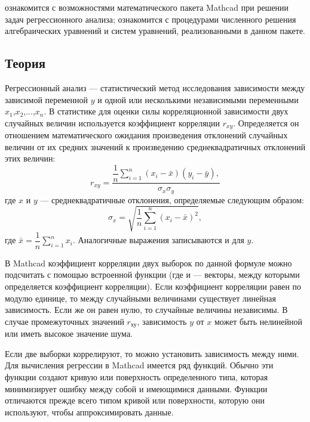 
\goal ознакомится с возможностями математического пакета Mathcad при решении задач регрессионного анализа; ознакомится с процедурами численного решения алгебраических уравнений и систем уравнений, реализованными в данном пакете. 

\subsection*{Теория}
Регрессионный анализ --- статистический метод исследования зависимости между зависимой переменной $y$ и одной или несколькими независимыми переменными $x_1$,$x_2$,...,$x_n$.
В статистике для оценки силы корреляционной зависимости двух случайных величин используется коэффициент корреляции $r_{xy}$. Определяется он отношением математического ожидания произведения отклонений случайных величин от их средних значений к произведению среднеквадратичных отклонений этих величин:
\begin{equation}
	r_{xy}=\dfrac{\dfrac{1}{n} \sum\limits_{i=1}^{n} (x_i-\bar{x}) (y_i-\bar{y}), }{\sigma_x \sigma_y}
\end{equation}
где $x$ и $y$ --- среднеквадратичные отклонения, определяемые следующим образом:
\begin{equation}
	\sigma_x=\sqrt{\dfrac{1}{n} \sum\limits_{i=1}^{n}(x_i-\bar{x})^2},
\end{equation}
где $\bar{x}=\dfrac{1}{n} \sum\limits_{i=1}^{n} x_i$.
Аналогичные выражения записываются и для $y$.

В Mathcad коэффициент корреляции двух выборок по данной формуле можно подсчитать с помощью встроенной функции  (где  и  --- векторы, между которыми определяется коэффициент корреляции). Если коэффициент корреляции равен по модулю единице, то между случайными величинами существует линейная зависимость. Если же он равен нулю, то случайные величины независимы. В случае промежуточных значений $r_{ху}$, зависимость $y$ от $x$ может быть нелинейной или иметь высокое значение шума.

Если две выборки коррелируют, то можно установить зависимость между ними. Для вычисления регрессии в Mathcad имеется ряд функций. Обычно эти функции создают кривую или поверхность определенного типа, которая минимизирует ошибку между собой и имеющимися данными. Функции отличаются прежде всего типом кривой или поверхности, которую они используют, чтобы аппроксимировать данные.

